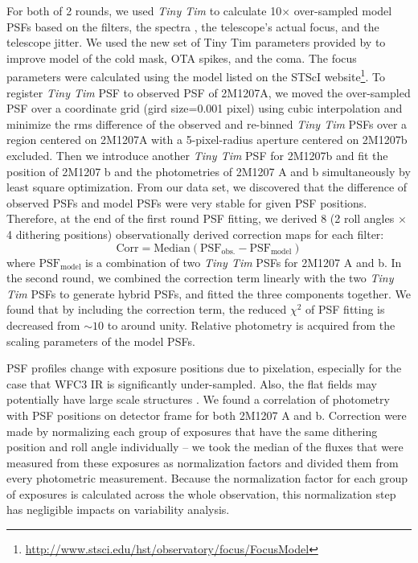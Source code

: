\documentclass[apj]{emulateapj}
\newcommand{\tinytim}{\textit{Tiny Tim}}
\begin{document}
For both of 2 rounds, we used {\em Tiny Tim} to calculate 10$\times$
over-sampled model PSFs based on the filters, the spectra 
\citep{Bonnefoy2014, Patience2010}, the telescope's actual focus, and
the telescope jitter.  We used the new set of Tiny Tim parameters
provided by \cite{Biretta2014} to improve model of the cold mask,
OTA spikes, and the coma. The focus parameters were calculated
using the model listed on the STScI
website\footnote{\url{http://www.stsci.edu/hst/observatory/focus/FocusModel}}. To
register \tinytim{} PSF to observed PSF of 2M1207A, we moved the
over-sampled PSF over a coordinate grid (gird size=0.001 pixel) using
cubic interpolation and minimize the rms difference of the
observed and re-binned \tinytim{} PSFs over a region centered on 2M1207A with a
5-pixel-radius aperture centered on 2M1207b excluded. Then we introduce
another \tinytim{} PSF for 2M1207b and  fit the
position of 2M1207 b and the photometries of 2M1207 A and b simultaneously
by least square optimization. From our data set, we discovered that
the difference of observed PSFs and model PSFs were very stable for
given PSF positions. Therefore, at the end of the first round PSF
fitting, we derived 8 (2 roll angles $\times$ 4 dithering positions)
observationally derived correction maps for each filter:
\begin{equation}
  \mathrm{Corr = Median(PSF_{obs.} - PSF_{model} )}
\end{equation}
where $\mathrm{PSF_{model}}$ is a combination of two \tinytim{} PSFs
for 2M1207 A and b. In the second round, we combined the correction
term linearly with the two \tinytim{} PSFs to generate hybrid PSFs,
and fitted the three components together. We found that by including the correction term,
the reduced $\chi^{2}$ of PSF fitting is decreased from $\sim 10$ to
around unity. Relative photometry is acquired from the scaling
parameters of the model PSFs.

PSF profiles change with exposure positions due to
pixelation, especially for the case that WFC3 IR is significantly
under-sampled. Also, the flat fields may potentially have large scale
structures \citep{dressel2012wide}. We found a correlation of
photometry with PSF positions on detector frame for both 2M1207 A and
b. Correction were made by normalizing each group of
exposures that have the same dithering position and roll angle
individually -- we took the median of the fluxes that were measured
from these exposures as normalization factors and divided them from
every photometric measurement. Because the normalization factor for
each group of exposures is calculated across the whole observation,
this normalization step has negligible impacts on variability
analysis.
\end{document}
